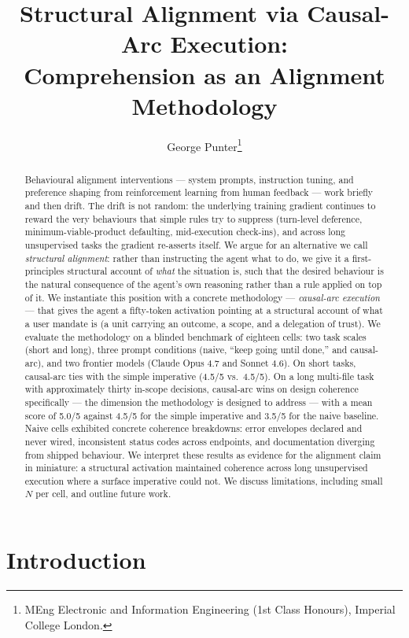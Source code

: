 \documentclass[11pt]{article}
\title{\bfseries Structural Alignment via Causal-Arc Execution:\\
Comprehension as an Alignment Methodology}
\author{George Punter\thanks{MEng Electronic and Information Engineering (1st Class Honours), Imperial College London.}}
\affil{Condri \\ \texttt{george@condri.app}}
\date{}
\begin{document}
\maketitle
\vspace{-2.5em}

\begin{abstract}
\noindent
Behavioural alignment interventions --- system prompts, instruction tuning,
and preference shaping from reinforcement learning from human feedback ---
work briefly and then drift. The drift is not random: the underlying training
gradient continues to reward the very behaviours that simple rules try to
suppress (turn-level deference, minimum-viable-product defaulting,
mid-execution check-ins), and across long unsupervised tasks the gradient
re-asserts itself. We argue for an alternative we call \emph{structural
alignment}: rather than instructing the agent what to do, we give it a
first-principles structural account of \emph{what} the situation is, such
that the desired behaviour is the natural consequence of the agent's own
reasoning rather than a rule applied on top of it. We instantiate this
position with a concrete methodology --- \emph{causal-arc execution} ---
that gives the agent a fifty-token activation pointing at a structural
account of what a user mandate is (a unit carrying an outcome, a scope, and
a delegation of trust). We evaluate the methodology on a blinded benchmark
of eighteen cells: two task scales (short and long), three prompt conditions
(naive, ``keep going until done,'' and causal-arc), and two frontier models
(Claude Opus 4.7 and Sonnet 4.6). On short tasks, causal-arc ties with the
simple imperative (4.5/5 vs.\ 4.5/5). On a long multi-file task with
approximately thirty in-scope decisions, causal-arc wins on design
coherence specifically --- the dimension the methodology is designed to
address --- with a mean score of 5.0/5 against 4.5/5 for the simple
imperative and 3.5/5 for the naive baseline. Naive cells exhibited
concrete coherence breakdowns: error envelopes declared and never wired,
inconsistent status codes across endpoints, and documentation diverging
from shipped behaviour. We interpret these results as evidence for the
alignment claim in miniature: a structural activation maintained coherence
across long unsupervised execution where a surface imperative could not.
We discuss limitations, including small $N$ per cell, and outline
future work.
\end{abstract}

\section{Introduction}
\end{document}
